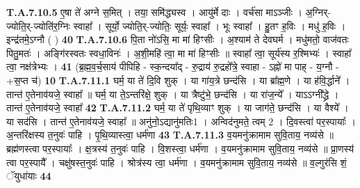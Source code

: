 \documentclass[17pt]{extarticle}
\begin{document}
                  \newline
                                                                  \textbf{ T.A.7.10.5} \newline
                  ए॒षा ते॑ अग्ने स॒मित् । तया॒ समि॑द्ध्यस्व । आयु॑र्मे दाः । वर्च॑सा माऽञ्जीः । अ॒ग्निर्-ज्योति॒र्-ज्योति॑र॒ग्निः स्वाहा᳚ ।  सूर्यो॒ ज्योति॒र्-ज्योतिः॒ सूर्यः॒ स्वाहा᳚ । भूः स्वाहा᳚ । हु॒तꣳ ह॒विः । मधु॑ ह॒विः । इन्द्र॑तमे॒ऽग्नौ ( ) \textbf{ 40} \newline
                  \newline
                                                                  \textbf{ T.A.7.10.6} \newline
                  पि॒ता नो॑ऽसि॒ मा मा॑ हिꣳसीः । अ॒श्याम॑ ते देवघर्म ।  मधु॑मतो॒ वाज॑वतः पितु॒मतः॑ । अङ्गि॑रस्वतः स्वधा॒विनः॑ । अ॒शी॒महि॑ त्वा॒ मा मा॑ हिꣳसीः ॥ स्वाहा᳚ त्वा॒ सूर्य॑स्य र॒श्मिभ्यः॑ । स्वाहा᳚ त्वा॒ नक्ष॑त्रेभ्यः । \textbf{ 41} \newline
                  \newline
                                                        (ब्र॒ह्म॒व॒र्च॒साय॑ पीपिहि - स्क॒न्दया᳚द् - रु॒द्राय॑ रु॒द्रहो᳚त्रे॒ स्वाहा - ऽह्नो॑ मा पाह् - य॒ग्नौ - +स॒प्त च॑) \textbf{10} \newline \newline
                                \textbf{ T.A.7.11.1} \newline
                  घर्म॒ या ते॑ दि॒वि शुक् । या गा॑य॒त्रे छन्द॑सि । या ब्रा᳚ह्म॒णे । या ह॑वि॒र्द्धाने᳚ । तान्त॑ ए॒तेनाव॑यजे॒ स्वाहा᳚ ॥ घर्म॒ या ते॒ऽन्तरि॑क्षे॒ शुक् ।  या त्रैष्टु॑भे॒ छन्द॑सि । या रा॑ज॒न्ये᳚ । याऽऽग्नी᳚द्ध्रे ।  तान्त॑ ए॒तेनाव॑यजे॒ स्वाहा᳚ \textbf{ 42} \newline
                  \newline
                                                                  \textbf{ T.A.7.11.2} \newline
                  घर्म॒ या ते॑ पृथि॒व्याꣳ शुक् । या जाग॑ते॒ छन्द॑सि । या वैश्ये᳚ । या सद॑सि । तान्त॑ ए॒तेनाव॑यजे॒ स्वाहा᳚ ॥ अनु॑नो॒ऽद्यानु॑मतिः{1} । अन्विद॑नुमते॒ त्वम् {2} । दि॒वस्त्वा॑ पर॒स्पायाः᳚ । अ॒न्तरि॑क्षस्य त॒नुवः॑ पाहि । पृ॒थि॒व्यास्त्वा॒ धर्म॑णा \textbf{ 43} \newline
                  \newline
                                                                  \textbf{ T.A.7.11.3} \newline
                  व॒यमनु॑क्रामाम सुवि॒ताय॒ नव्य॑से ॥ ब्रह्म॑णस्त्वा पर॒स्पायाः᳚ । क्ष॒त्रस्य॑ त॒नुवः॑ पाहि । वि॒शस्त्वा॒ धर्म॑णा । व॒यमनु॑क्रामाम सुवि॒ताय॒ नव्य॑से ॥ प्रा॒णस्य॑ त्वा पर॒स्पायै᳚ । चक्षु॑षस्त॒नुवः॑ पाहि । श्रोत्र॑स्य त्वा॒ धर्म॑णा । व॒यमनु॑क्रामाम सुवि॒ताय॒ नव्य॑से ॥ व॒ल्गुर॑सि शं॒ ॅयुधा॑याः \textbf{ 44} \newline
\end{document}
